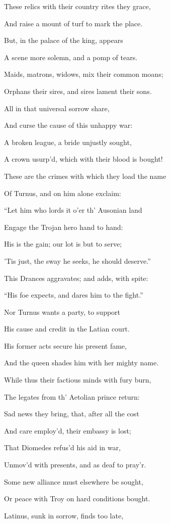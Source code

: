 These relics with their country rites they grace,

And raise a mount of turf to mark the place.

But, in the palace of the king, appears

A scene more solemn, and a pomp of tears.

Maids, matrons, widows, mix their common moans;

Orphans their sires, and sires lament their sons.

All in that universal sorrow share,

And curse the cause of this unhappy war:

A broken league, a bride unjustly sought,

A crown usurp’d, which with their blood is bought!

These are the crimes with which they load the name

Of Turnus, and on him alone exclaim:

“Let him who lords it o’er th’ Ausonian land

Engage the Trojan hero hand to hand:

His is the gain; our lot is but to serve;

’Tis just, the sway he seeks, he should deserve.”

This Drances aggravates; and adds, with spite:

“His foe expects, and dares him to the fight.”

Nor Turnus wants a party, to support

His cause and credit in the Latian court.

His former acts secure his present fame,

And the queen shades him with her mighty name.

While thus their factious minds with fury burn,

The legates from th’ Aetolian prince return:

Sad news they bring, that, after all the cost

And care employ’d, their embassy is lost;

That Diomedes refus’d his aid in war,

Unmov’d with presents, and as deaf to pray’r.

Some new alliance must elsewhere be sought,

Or peace with Troy on hard conditions bought.

Latinus, sunk in sorrow, finds too late,

